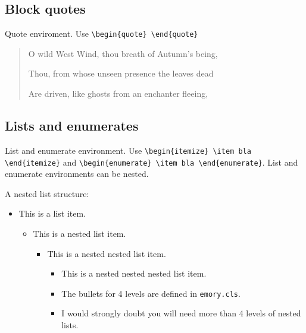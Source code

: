\documentclass[draft, twoside]{emory}
\begin{document}
\subsection{Block quotes}
Quote enviroment. Use \Verb|\begin{quote} \end{quote}|

\begin{quote}\label{poet}
O wild West Wind, thou breath of Autumn’s being,

Thou, from whose unseen presence the leaves dead

Are driven, like ghosts from an enchanter fleeing,
\end{quote}

\subsection{Lists and enumerates}
List and enumerate environment. Use \Verb|\begin{itemize} \item bla \end{itemize}|
and \Verb|\begin{enumerate} \item bla \end{enumerate}|. List and enumerate environments
can be nested.

A nested list structure:
\begin{itemize}
  \item This is a list item.
  \begin{itemize}
    \item This is a nested list item.
    \begin{itemize}
      \item This is a nested nested list item.
      \begin{itemize}
        \item This is a nested nested nested list item. 
        \item The bullets for 4 levels are defined in \Verb|emory.cls|.
        \item I would strongly doubt you will need more than 4 levels of nested lists.
      \end{itemize}
    \end{itemize}
  \end{itemize}    
\end{itemize}
\end{document}
